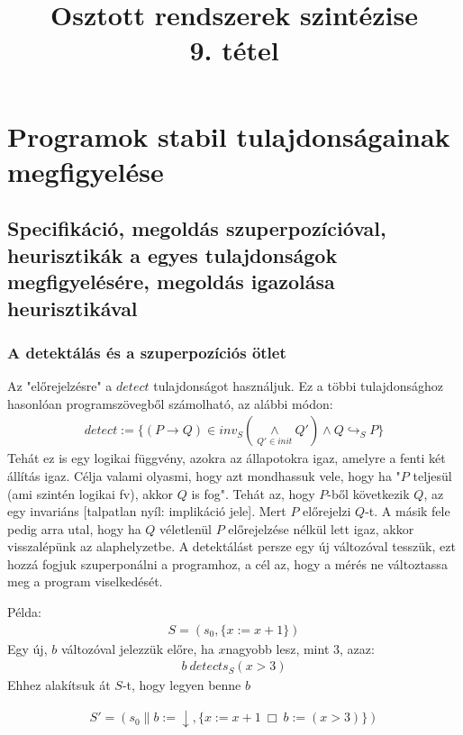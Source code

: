 \documentclass{article}
\title{Osztott rendszerek szintézise\\9. tétel}
\newcommand{\false}{\downarrow}
\newcommand{\pp}{\parallel}
\begin{document}

\section*{Programok stabil tulajdonságainak megfigyelése}
\subsection{Specifikáció, megoldás szuperpozícióval, heurisztikák a egyes tulajdonságok megfigyelésére, megoldás igazolása heurisztikával}
\subsubsection*{A detektálás és a szuperpozíciós ötlet}
Az "előrejelzésre" a $detect$ tulajdonságot használjuk. Ez a többi tulajdonsághoz hasonlóan programszövegből számolható, az alábbi módon:
\begin{align*}
detect := \lbrace (P \rightarrow Q) \in inv_S(\underset{Q' \in init}{\land} Q') \land Q \hookrightarrow_S P \rbrace
\end{align*}
Tehát ez is egy logikai függvény, azokra az állapotokra igaz, amelyre a fenti két állítás igaz. Célja valami olyasmi, hogy azt mondhassuk vele, hogy ha "$P$ teljesül (ami szintén logikai fv), akkor $Q$ is fog". Tehát az, hogy $P$-ből következik $Q$, az egy invariáns [talpatlan nyíl: implikáció jele]. Mert $P$ előrejelzi $Q$-t. A másik fele pedig arra utal, hogy ha $Q$ véletlenül $P$ előrejelzése nélkül lett igaz, akkor visszalépünk az alaphelyzetbe. A detektálást persze egy új változóval tesszük, ezt hozzá fogjuk szuperponálni a programhoz, a cél az, hogy a mérés ne változtassa meg a program viselkedését.

Példa:
\begin{align*}
S = (s_0, \lbrace x:= x+1 \rbrace)
\end{align*}
Egy új,  $b$ változóval jelezzük előre, ha $x $nagyobb lesz, mint 3, azaz:
\begin{align*}
b\ detects_S(x>3)
\end{align*}
Ehhez alakítsuk át $S$-t, hogy legyen benne $b$

\begin{align*}
S' = (s_0 \pp b:= \false, \lbrace x:= x+1\ \Box\ b:=(x>3) \rbrace)
\end{align*}
\end{document}

